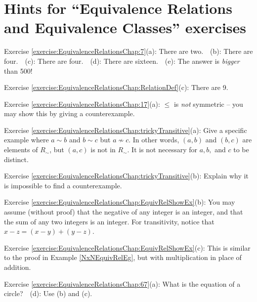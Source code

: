 \section{Hints for ``Equivalence Relations and Equivalence Classes'' exercises}\label{sec:EquivalenceRelationsChap:hints} 

\noindent Exercise \ref{exercise:EquivalenceRelationsChap:7}(a): There are two.~~(b): There are four.~~(c): There are four.~~(d): There are sixteen.~~(e): The answer is \emph{bigger} than 500!

\noindent Exercise \ref{exercise:EquivalenceRelationsChap:RelationDef}(c): There are 9.

\noindent Exercise \ref{exercise:EquivalenceRelationsChap:17}(a): $\leq$ is \emph{not} symmetric -- you may show this by giving a counterexample.

\noindent Exercise \ref{exercise:EquivalenceRelationsChap:trickyTransitive}(a): Give a specific example where $a \sim b$ and $b \sim c$ but $a \not\sim c$.  In other words, $(a,b)$ and $(b,c)$ are elements of $R_{\sim}$, but $(a,c)$ is not in  $R_{\sim}$. It is not necessary for $a,b,$ and $c$ to be distinct.

\noindent Exercise \ref{exercise:EquivalenceRelationsChap:trickyTransitive}(b): Explain why it is impossible to find a counterexample.

\noindent Exercise \ref{exercise:EquivalenceRelationsChap:EquivRelShowEx}(b): You may assume (without proof) that the negative of any integer is an integer, and that the sum of any two integers is an integer. For transitivity, notice that $x - z = (x - y) + (y - z)$.

\noindent Exercise \ref{exercise:EquivalenceRelationsChap:EquivRelShowEx}(c): This is similar to the proof in Example \ref{NxNEquivRelEg}, but with multiplication in place of addition.

\noindent Exercise \ref{exercise:EquivalenceRelationsChap:67}(a): What is the equation of a circle?~~(d): Use (b) and (c).
